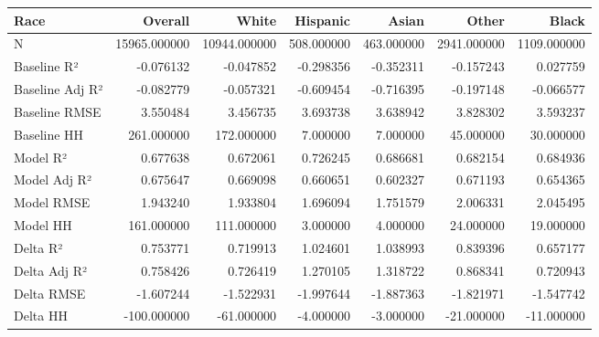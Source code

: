 \begin{tabular}{lrrrrrr}
\toprule
Race &       Overall &         White &    Hispanic &       Asian &        Other &        Black \\
\midrule
N               &  15965.000000 &  10944.000000 &  508.000000 &  463.000000 &  2941.000000 &  1109.000000 \\
Baseline R²     &     -0.076132 &     -0.047852 &   -0.298356 &   -0.352311 &    -0.157243 &     0.027759 \\
Baseline Adj R² &     -0.082779 &     -0.057321 &   -0.609454 &   -0.716395 &    -0.197148 &    -0.066577 \\
Baseline RMSE   &      3.550484 &      3.456735 &    3.693738 &    3.638942 &     3.828302 &     3.593237 \\
Baseline HH     &    261.000000 &    172.000000 &    7.000000 &    7.000000 &    45.000000 &    30.000000 \\
Model R²        &      0.677638 &      0.672061 &    0.726245 &    0.686681 &     0.682154 &     0.684936 \\
Model Adj R²    &      0.675647 &      0.669098 &    0.660651 &    0.602327 &     0.671193 &     0.654365 \\
Model RMSE      &      1.943240 &      1.933804 &    1.696094 &    1.751579 &     2.006331 &     2.045495 \\
Model HH        &    161.000000 &    111.000000 &    3.000000 &    4.000000 &    24.000000 &    19.000000 \\
Delta R²        &      0.753771 &      0.719913 &    1.024601 &    1.038993 &     0.839396 &     0.657177 \\
Delta Adj R²    &      0.758426 &      0.726419 &    1.270105 &    1.318722 &     0.868341 &     0.720943 \\
Delta RMSE      &     -1.607244 &     -1.522931 &   -1.997644 &   -1.887363 &    -1.821971 &    -1.547742 \\
Delta HH        &   -100.000000 &    -61.000000 &   -4.000000 &   -3.000000 &   -21.000000 &   -11.000000 \\
\bottomrule
\end{tabular}
